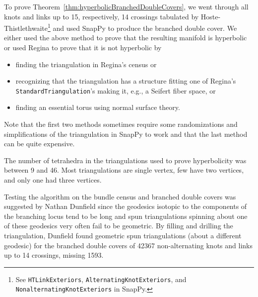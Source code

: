 \documentclass[utopia,fullpage]{nmd/article}
\begin{document}
To prove Theorem~\ref{thm:hyperbolicBranchedDoubleCovers}, we went through all knots and links up to 15, respectively, 14 crossings tabulated by Hoste-Thistlethwaite\footnote{See \texttt{HTLinkExteriors}, \texttt{AlternatingKnotExteriors}, and \texttt{NonalternatingKnotExteriors} in SnapPy.} and used SnapPy to produce the branched double cover. We either used the above method to prove that the resulting manifold is hyperbolic or used Regina \cite{Regina} to prove that it is not hyperbolic by
\begin{itemize}
\item finding the triangulation in Regina's census or
\item recognizing that the triangulation has a structure fitting one of Regina's\\ \texttt{StandardTriangulation}'s making it, e.g., a Seifert fiber space, or
\item finding an essential torus using normal surface theory. %
\end{itemize}
Note that the first two methods sometimes require some randomizations and simplifications of the triangulation in SnapPy to work and that the last method can be quite expensive.

The number of tetrahedra in the triangulations used to prove hyperbolicity was between 9 and 46. Most triangulations are single vertex, few have two vertices, and only one had three vertices.

Testing the algorithm on the bundle census and branched double covers was suggested by Nathan Dunfield since the geodesics isotopic to the components of the branching locus tend to be long and spun triangulations spinning about one of these geodesics very often fail to be geometric. By filling and drilling the triangulation, Dunfield found geometric spun triangulations (about a different geodesic) for the branched double covers of 42367 non-alternating knots and links up to 14 crossings, missing 1593.

\end{document}
